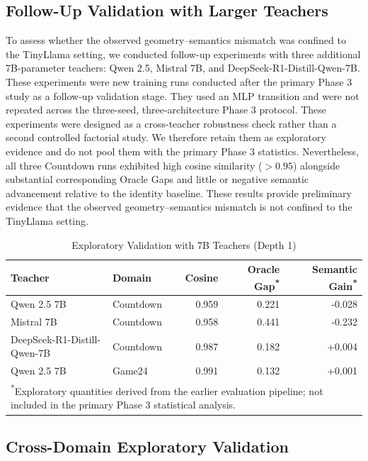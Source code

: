 \documentclass[conference]{IEEEtran}
\begin{document}
\subsection{Follow-Up Validation with Larger Teachers}

To assess whether the observed geometry--semantics mismatch was confined to the TinyLlama setting, we conducted follow-up experiments with three additional 7B-parameter teachers: Qwen 2.5, Mistral 7B, and DeepSeek-R1-Distill-Qwen-7B. These experiments were new training runs conducted after the primary Phase 3 study as a follow-up validation stage. They used an MLP transition and were not repeated across the three-seed, three-architecture Phase 3 protocol. These experiments were designed as a cross-teacher robustness check rather than a second controlled factorial study. We therefore retain them as exploratory evidence and do not pool them with the primary Phase 3 statistics. Nevertheless, all three Countdown runs exhibited high cosine similarity ($>0.95$) alongside substantial corresponding Oracle Gaps and little or negative semantic advancement relative to the identity baseline. These results provide preliminary evidence that the observed geometry--semantics mismatch is not confined to the TinyLlama setting.

\begin{table}[t]
\centering
\caption{Exploratory Validation with 7B Teachers (Depth 1)}
\label{tab:larger_teachers}
\begin{tabular}{llrrr}
\toprule
Teacher & Domain & Cosine & Oracle Gap\textsuperscript{*} & Semantic Gain\textsuperscript{*} \\
\midrule
Qwen 2.5 7B & Countdown & 0.959 & 0.221 & -0.028 \\
Mistral 7B & Countdown & 0.958 & 0.441 & -0.232 \\
DeepSeek-R1-Distill-Qwen-7B & Countdown & 0.987 & 0.182 & +0.004 \\
Qwen 2.5 7B & Game24 & 0.991 & 0.132 & +0.001 \\
\bottomrule
\multicolumn{5}{p{0.95\textwidth}}{\small \textsuperscript{*}Exploratory quantities derived from the earlier evaluation pipeline; not included in the primary Phase 3 statistical analysis.}
\end{tabular}
\end{table}

\subsection{Cross-Domain Exploratory Validation}
\end{document}

